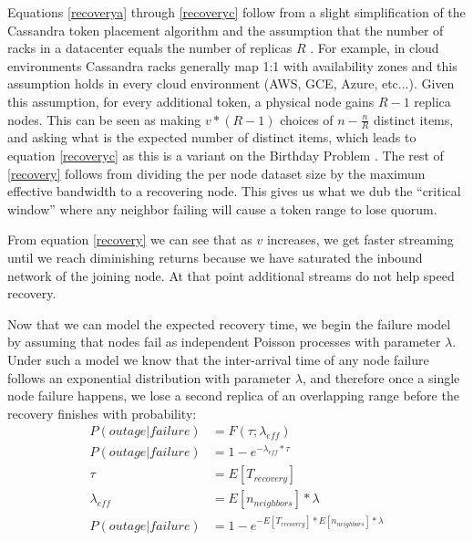 \documentclass{article}
\begin{document}
Equations \ref{recoverya} through \ref{recoveryc} follow from a slight simplification of the Cassandra token placement algorithm and the assumption that the number of racks in a datacenter equals the number of replicas $R$ \cite{replication}. For example, in cloud environments Cassandra racks generally map 1:1 with availability zones and this assumption holds in every cloud environment (AWS, GCE, Azure, etc...). Given this assumption, for every additional token, a physical node gains $R - 1$ replica nodes. This can be seen as making $v * (R - 1)$ choices of $n - \frac{n}{R}$ distinct items, and asking what is the expected number of distinct items, which leads to equation \ref{recoveryc} as this is a variant on the Birthday Problem \cite{neighbors}. The rest of \ref{recovery} follows from dividing the per node dataset size by the maximum effective bandwidth to a recovering node. This gives us what we dub the ``critical window'' where any neighbor failing will cause a token range to lose quorum.

From equation \ref{recovery} we can see that as $v$ increases, we get faster streaming until we reach diminishing returns because we have saturated the inbound network of the joining node. At that point additional streams do not help speed recovery.

Now that we can model the expected recovery time, we begin the failure model by assuming that nodes fail as independent Poisson processes with parameter $\lambda$. Under such a model we know that the inter-arrival time of any node failure follows an exponential distribution with parameter $\lambda$, and therefore once a single node failure happens, we lose a second replica of an overlapping range before the recovery finishes with probability:
\begin{subequations} \label{avail}
\begin{align}
        P(outage|failure) & = F(\tau; \lambda_{eff}) \\ \label{availa}
        P(outage|failure) & = 1 - e^{-\lambda_{eff} * \tau} \\ \label{availb}
        \tau & = E[T_{recovery}] \\ \label{availc}
        \lambda_{eff} & = E[n_{neighbors}] * \lambda \\ \label{availd}
        P(outage|failure) & = 1 - e^{- E[T_{recovery}] * E[n_{neighbors}] * \lambda}
\end{align}
\end{subequations}
\end{document}
